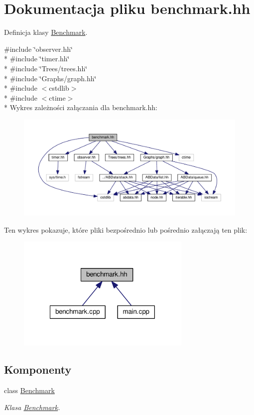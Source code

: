 \hypertarget{benchmark_8hh}{\section{Dokumentacja pliku benchmark.\-hh}
\label{benchmark_8hh}
}


Definicja klasy \hyperlink{class_benchmark}{Benchmark}.  


{\ttfamily \#include \char`\"{}observer.\-hh\char`\"{}}\\*
{\ttfamily \#include \char`\"{}timer.\-hh\char`\"{}}\\*
{\ttfamily \#include \char`\"{}Trees/trees.\-hh\char`\"{}}\\*
{\ttfamily \#include \char`\"{}Graphs/graph.\-hh\char`\"{}}\\*
{\ttfamily \#include $<$cstdlib$>$}\\*
{\ttfamily \#include $<$ctime$>$}\\*
Wykres zależności załączania dla benchmark.\-hh\-:
\nopagebreak
\begin{figure}[H]
\begin{center}
\leavevmode
\includegraphics[width=350pt]{benchmark_8hh__incl}
\end{center}
\end{figure}
Ten wykres pokazuje, które pliki bezpośrednio lub pośrednio załączają ten plik\-:\nopagebreak
\begin{figure}[H]
\begin{center}
\leavevmode
\includegraphics[width=237pt]{benchmark_8hh__dep__incl}
\end{center}
\end{figure}
\subsection*{Komponenty}
\begin{DoxyCompactItemize}
\item 
class \hyperlink{class_benchmark}{Benchmark}
\begin{DoxyCompactList}\small\item\em Klasa \hyperlink{class_benchmark}{Benchmark}. \end{DoxyCompactList}\end{DoxyCompactItemize}
